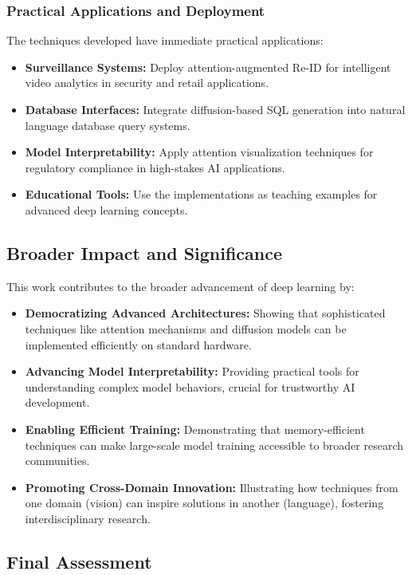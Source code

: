 \documentclass[a4paper,12pt]{article}
\begin{document}
\subsubsection*{Practical Applications and Deployment}
The techniques developed have immediate practical applications:

\begin{itemize}
    \item \textbf{Surveillance Systems:} Deploy attention-augmented Re-ID for intelligent video analytics in security and retail applications.
    \item \textbf{Database Interfaces:} Integrate diffusion-based SQL generation into natural language database query systems.
    \item \textbf{Model Interpretability:} Apply attention visualization techniques for regulatory compliance in high-stakes AI applications.
    \item \textbf{Educational Tools:} Use the implementations as teaching examples for advanced deep learning concepts.
\end{itemize}

\subsection{Broader Impact and Significance}

This work contributes to the broader advancement of deep learning by:

\begin{itemize}
    \item \textbf{Democratizing Advanced Architectures:} Showing that sophisticated techniques like attention mechanisms and diffusion models can be implemented efficiently on standard hardware.
    \item \textbf{Advancing Model Interpretability:} Providing practical tools for understanding complex model behaviors, crucial for trustworthy AI development.
    \item \textbf{Enabling Efficient Training:} Demonstrating that memory-efficient techniques can make large-scale model training accessible to broader research communities.
    \item \textbf{Promoting Cross-Domain Innovation:} Illustrating how techniques from one domain (vision) can inspire solutions in another (language), fostering interdisciplinary research.
\end{itemize}

\subsection{Final Assessment}
\end{document}
